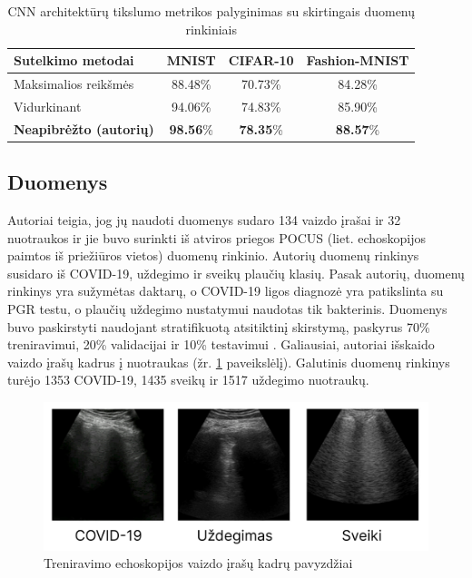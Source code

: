 \documentclass[fleqn]{VUMIFKompMagistrinis}
\begin{document}
\begin{table}[H]\footnotesize
  \centering
\caption{CNN architektūrų tikslumo metrikos palyginimas su skirtingais duomenų rinkiniais}
\begin{tabular}{|l|c|c|c|}
\hline
Sutelkimo metodai & MNIST & CIFAR-10 & Fashion-MNIST \\
\hline
Maksimalios reikšmės & 88.48\% & 70.73\% & 84.28\% \\
Vidurkinant & 94.06\% & 74.83\% & 85.90\% \\
\textbf{Neapibrėžto (autorių)} & \textbf{98.56}\% & \textbf{78.35}\% & \textbf{88.57}\% \\
\hline
  \end{tabular}
  \label{tab:fuzzylentele}
\end{table}

\subsection{Duomenys}
Autoriai teigia, jog jų naudoti duomenys sudaro 134 vaizdo įrašai ir 32 nuotraukos ir jie buvo surinkti iš atviros priegos POCUS (liet. echoskopijos paimtos iš priežiūros vietos) duomenų rinkinio. Autorių duomenų rinkinys susidaro iš COVID-19, uždegimo ir sveikų plaučių klasių. Pasak autorių, duomenų rinkinys yra sužymėtas daktarų, o COVID-19 ligos diagnozė yra patikslinta su PGR testu, o plaučių uždegimo nustatymui naudotas tik bakterinis. Duomenys buvo paskirstyti naudojant stratifikuotą atsitiktinį skirstymą, paskyrus 70\% treniravimui, 20\% validacijai ir 10\% testavimui \cite{HASAN2023}. Galiausiai, autoriai išskaido vaizdo įrašų kadrus į nuotraukas (žr. \ref{img:plauciai} paveikslėlį). Galutinis duomenų rinkinys turėjo 1353 COVID-19, 1435 sveikų ir 1517 uždegimo nuotraukų. 
\begin{figure}[H]
    \centering
    \includegraphics[scale=0.40]{img/plauciai.PNG}
    \caption{Treniravimo echoskopijos vaizdo įrašų kadrų pavyzdžiai \cite{HASAN2023}}
    \label{img:plauciai}
\end{figure}\par
\end{document}
